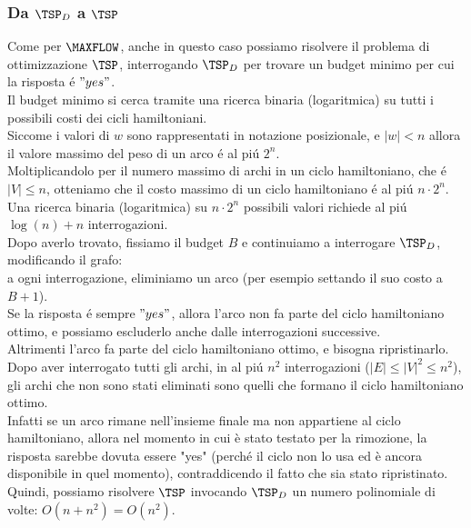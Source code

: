 \subsubsection{Da $\TSP_D$ a $\TSP$}
Come per $\MAXFLOW$, anche in questo caso possiamo risolvere il problema di ottimizzazione $\TSP$,
interrogando $\TSP_D$ per trovare un budget minimo per cui la risposta é $"yes"$. \\
Il budget minimo si cerca tramite una ricerca binaria (logaritmica) su tutti i possibili costi dei cicli hamiltoniani. \\

Siccome i valori di $w$ sono rappresentati in notazione posizionale, e $|w| < n$ allora il valore massimo
del peso di un arco é al piú $2^n$. \\
Moltiplicandolo per il numero massimo di archi in un ciclo hamiltoniano, che é $|V| \leq n$,
otteniamo che il costo massimo di un ciclo hamiltoniano é al piú $n \cdot 2^n$. \\
Una ricerca binaria (logaritmica) su $n \cdot 2^n$ possibili valori richiede al piú $\log(n) + n$ interrogazioni. \\

Dopo averlo trovato, fissiamo il budget $B$ e continuiamo a interrogare $\TSP_D$, modificando il grafo: \\ 
a ogni interrogazione, eliminiamo un arco (per esempio settando il suo costo a $B + 1$). \\
Se la risposta é sempre $"yes"$, allora l'arco non fa parte del ciclo hamiltoniano ottimo, e possiamo escluderlo anche dalle interrogazioni successive. \\
Altrimenti l'arco fa parte del ciclo hamiltoniano ottimo, e bisogna ripristinarlo. \\

Dopo aver interrogato tutti gli archi, in al piú $n^2$ interrogazioni ($|E| \leq |V|^2 \leq n^2$), 
gli archi che non sono stati eliminati sono quelli che formano il ciclo hamiltoniano ottimo. \\
Infatti se un arco rimane nell'insieme finale  ma non appartiene al ciclo hamiltoniano, 
allora nel momento in cui è stato testato per la rimozione, la risposta sarebbe dovuta essere "yes" 
(perché il ciclo non lo usa ed è ancora disponibile in quel momento), contraddicendo il fatto che 
sia stato ripristinato. \\

Quindi, possiamo risolvere $\TSP$ invocando $\TSP_D$ un numero polinomiale di volte: $O(n + n^2) = O(n^2)$.

